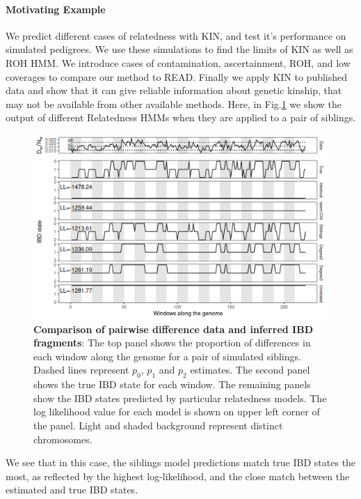 \documentclass[12pt, letterpaper]{article}
\begin{document}
\paragraph{Motivating Example}
We predict different cases of relatedness with KIN, and test it's performance on simulated pedigrees. We use these simulations to find the limits of KIN as well as ROH HMM. We introduce cases of contamination, ascertainment, ROH, and low coverages to compare our method to READ. Finally we apply KIN to published data and show that it can give reliable information about genetic kinship, that may not be available from other available methods. Here, in Fig.\ref{fig1:ibd} we show the output of different Relatedness HMMs when they are applied to a pair of siblings.

\begin{figure}[h!]
    \includegraphics[width=16cm]{plots/plotimg/IBDplot.png}
    \centering
    \caption{\textbf{Comparison of pairwise difference data  and inferred IBD fragments}:  The top panel shows the proportion of differences in each window along the genome for a pair of simulated siblings. Dashed lines represent $p_0$, $p_1$ and $p_2$ estimates. The second panel shows the true IBD state for each window. The remaining panels show the IBD states predicted by particular relatedness models. The log likelihood value for each model is shown on upper left corner of the panel. Light and shaded background represent distinct chromosomes.}
    \label{fig1:ibd}
\end{figure}

We see that in this case, the siblings model predictions match true IBD states the most, as reflected by the highest log-likelihood, and the close match between the estimated and true IBD states. 
\end{document}
